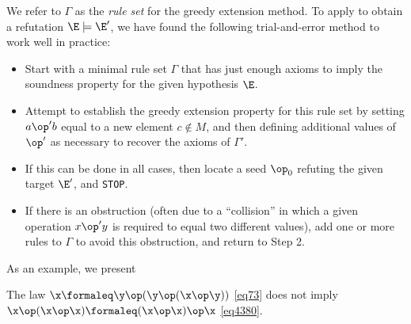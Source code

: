 We refer to $\Gamma$ as the \emph{rule set} for the greedy extension method. To apply  to obtain a refutation $\E \models {\E'}$, we have found the following trial-and-error method to work well in practice:
\begin{itemize}
\item[1.] Start with a minimal rule set $\Gamma$ that has just enough axioms to imply the soundness property for the given hypothesis $\E$.
\item[2.] Attempt to establish the greedy extension property for this rule set by setting $a \op' b$ equal to a new element $c \not \in M$, and then defining additional values of $\op'$ as necessary to recover the axioms of $\Gamma'$.
\item[3.]  If this can be done in all cases, then locate a seed $\op_0$ refuting the given target ${\E'}$, and \texttt{STOP}.
\item[4.]  If there is an obstruction (often due to a ``collision'' in which a given operation $x \op' y$ is required to equal two different values), add one or more rules to $\Gamma$ to avoid this obstruction, and return to Step 2.
\end{itemize}

As an example, we present

\begin{proposition}[$\Eq{73} \nmodels \Eq{4380}$]\label{73-4380} The law $\x \formaleq \y \op (\y \op (\x \op \y))$ \eqref{eq73} does not imply $\x \op (\x \op \x) \formaleq (\x \op \x) \op \x$ \eqref{eq4380}.
\end{proposition}

